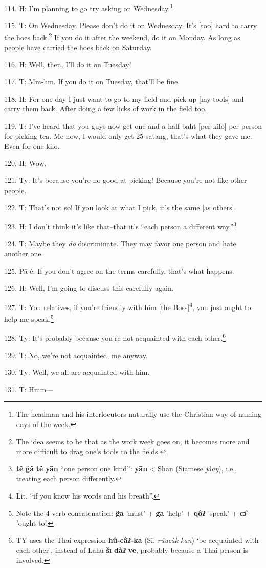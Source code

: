 114. H: I'm planning to go try asking on Wednesday.\footnote{The headman and his interlocutors naturally use the Christian way of naming days of the week.}

115. T: On Wednesday. Please don't do it on Wednesday. It's [too] hard to carry
the hoes back.\footnote{The idea seems to be that as the work week goes on, it becomes more and more difficult to drag one's tools to the fields.} If you do it after the weekend, do it on Monday. As long as
people have carried the hoes back on Saturday.

116. H: Well, then, I'll do it on Tuesday!

117. T: Mm-hm. If you do it on Tuesday, that'll be fine.

118. H: For one day I just want to go to my field and pick up [my tools]
and carry them back. After doing a few licks of work in the field too.

119. T: I've heard that you guys now get one and a half baht [per kilo] per person
for picking tea. Me now, I would only get 25 satang, that's what they gave me.
Even for one kilo.

120. H: Wow.

121. Ty: It's because you're no good at picking! Because you're not like other
people.

122. T: That's not so! If you look at what I pick, it's the same [as others].

123. H: I don't think it's like that--that it's ``each person a different
way.''\footnote{\textbf{tê} \textbf{g̈â} \textbf{tê} \textbf{yān} ``one person one kind'': \textbf{yān} < Shan (Siamese\textit{ jàaŋ}), i.e., treating each person differently.}

124. T: Maybe they \textit{do} discriminate. They may favor one person and hate
another one.

125. Pā-é: If you don't agree on the terms carefully, that's what happens.

126. H: Well, I'm going to discuss this carefully again.

127. T: You relatives, if you're friendly with him [the Boss]\footnote{Lit. ``if you know his words and his breath''.}, you just ought
to help me speak.\footnote{Note the 4-verb concatenation: \textbf{g̈a} 'must' + \textbf{ga} 'help' + \textbf{qôʔ} 'speak' + \textbf{cɔ̂} 'ought to'.}

128. Ty: It's probably because you're not acquainted with each other.\footnote{TY uses the Thai expression \textbf{hû-câʔ-kā} (Si.\textit{ rúucàk kan}) `be acquainted with each other', instead of Lahu \textbf{šī} \textbf{dàʔ} \textbf{ve}, probably because a Thai person is involved.}

129. T: No, we're not acquainted, me anyway.

130. Ty: Well, we all are acquainted with him.

131. T: Hmm---

